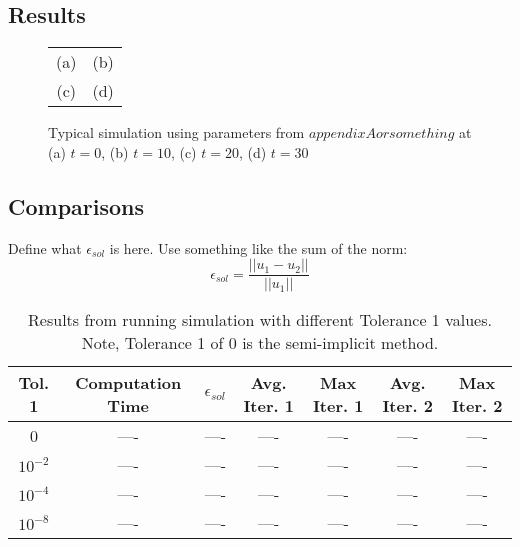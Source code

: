 \documentclass{article}
\begin{document}
  \subsection{Results}
    \begin{figure}[h!tb]
      \begin{center}
      \begin{tabular}{c c}
        (a) & (b) \\
        (c) & (d) \\
      \end{tabular}
      \caption{Typical simulation using parameters from $appendix A or something$ at (a) $t = 0$, (b) $t = 10$, (c) $t = 20$, (d) $t = 30$}
      \label{fig:typical_simulation_results}
      \end{center}
    \end{figure}

  \subsection{Comparisons}
    Define what $\epsilon_{sol}$ is here.
    Use something like the sum of the norm:
    \begin{equation}
      \epsilon_{sol} = \frac{||u_1 - u_2||}{||u_1||}
    \end{equation}

    \begin{table}[h!tb]
      \begin{center}
      \begin{tabular}{|c|c|c|c|c|c|c|}
        \hline
        Tol. 1 & Computation Time & $\epsilon_{sol}$ & Avg. Iter. 1 & Max Iter. 1 & Avg. Iter. 2 & Max Iter. 2 \\
        \hline
        0 & ---- & ---- & ---- & ---- & ---- & ---- \\
        $10^{-2}$ & ---- & ---- & ---- & ---- & ---- & ---- \\
        $10^{-4}$ & ---- & ---- & ---- & ---- & ---- & ---- \\
        $10^{-8}$ & ---- & ---- & ---- & ---- & ---- & ---- \\
        \hline
      \end{tabular}
      \caption{Results from running simulation with different Tolerance 1 values. Note, Tolerance 1 of 0 is the semi-implicit method.}
      \label{tab:tolerance_comparison}
      \end{center}
    \end{table}
\end{document}
